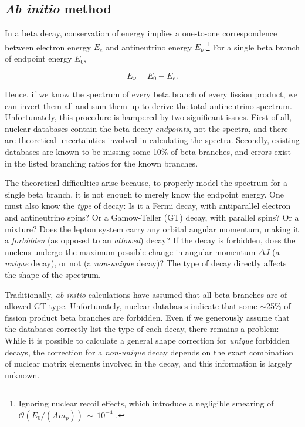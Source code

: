 \documentclass[../thesis.tex]{subfiles}
\begin{document}
\subsection{\textit{Ab initio} method}
\label{sec:abinitio}

In a beta decay, conservation of energy implies a one-to-one correspondence between electron energy $E_e$ and antineutrino energy $E_\nu$.\footnote{Ignoring nuclear recoil effects, which introduce a negligible smearing of $\mathcal{O}(E_0/(Am_p))\,\sim\,10^{-4}$ \cite{PhysRevC.84.024617}.} For a single beta branch of endpoint energy $E_0$,

\[ E_\nu = E_0 - E_e. \]

Hence, if we know the spectrum of every beta branch of every fission product, we can invert them all and sum them up to derive the total antineutrino spectrum. Unfortunately, this procedure is hampered by two significant issues. First of all, nuclear databases contain the beta decay \emph{endpoints}, not the spectra, and there are theoretical uncertainties involved in calculating the spectra. Secondly, existing databases \cite{ENSDF,JENDL} are known to be missing some 10\% of beta branches, and errors exist in the listed branching ratios for the known branches.

The theoretical difficulties arise because, to properly model the spectrum for a single beta branch, it is not enough to merely know the endpoint energy. One must also know the \emph{type} of decay: Is it a Fermi decay, with antiparallel electron and antineutrino spins? Or a Gamow-Teller (GT) decay, with parallel spins? Or a mixture? Does the lepton system carry any orbital angular momentum, making it a \emph{forbidden} (as opposed to an \emph{allowed}) decay? If the decay is forbidden, does the nucleus undergo the maximum possible change in angular momentum $\Delta J$ (a \emph{unique} decay), or not (a \emph{non-unique} decay)? The type of decay directly affects the shape of the spectrum.

Traditionally, \emph{ab initio} calculations have assumed that all beta branches are of allowed GT type. Unfortunately, nuclear databases indicate that some $\sim$25\% of fission product beta branches are forbidden. Even if we generously assume that the databases correctly list the type of each decay, there remains a problem: While it is possible to calculate a general shape correction for \emph{unique} forbidden decays, the correction for a \emph{non-unique} decay depends on the exact combination of nuclear matrix elements involved in the decay, and this information is largely unknown.
\end{document}

